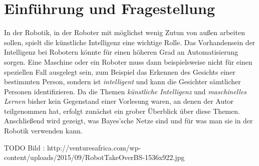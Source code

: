 \chapter{Einführung und Fragestellung}
In der Robotik, in der Roboter mit möglichst wenig Zutun von außen arbeiten sollen, spielt die künstliche Intelligenz eine wichtige Rolle. Das Vorhandensein der Intelligenz bei Robotern könnte für einen höheren Grad an Automatisierung sorgen. Eine Maschine oder ein Roboter muss dann beispielsweise nicht für einen speziellen Fall ausgelegt sein, zum Beispiel das Erkennen des Gesichts einer bestimmten Person, sondern ist \textit{intelligent} und kann die Gesichter sämtlicher Personen identifizieren. 
Da die Themen \textit{künstliche Intelligenz} und \textit{maschinelles Lernen} bisher kein Gegenstand einer Vorlesung waren, an denen der Autor teilgenommen hat, erfolgt zunächst ein grober Überblick über diese Themen.
Anschließend wird gezeigt, was Bayes'sche Netze sind und für was man sie in der Robotik verwenden kann. 

TODO Bild : http://venturesafrica.com/wp-content/uploads/2015/09/RobotTakeOverBS-1536x922.jpg
